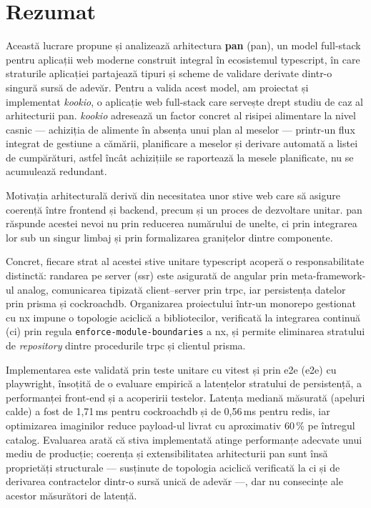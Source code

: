 \section*{Rezumat}

Această lucrare propune și analizează arhitectura \textbf{\gls{pan}} (\acrlong{pan}), un model full-stack pentru aplicații \gls{web} moderne construit integral în ecosistemul \gls{typescript}, în care straturile aplicației partajează tipuri și scheme de validare derivate dintr-o singură sursă de adevăr.
Pentru a valida acest model, am proiectat și implementat \textit{\gls{kookio}}, o aplicație \gls{web} full-stack care servește drept studiu de caz al arhitecturii \gls{pan}.
\textit{\gls{kookio}} adresează un factor concret al risipei alimentare la nivel casnic --- achiziția de alimente în absența unui plan al meselor --- printr-un flux integrat de gestiune a cămării, planificare a meselor și derivare automată a listei de cumpărături, astfel încât achizițiile se raportează la mesele planificate, nu se acumulează redundant.

Motivația arhitecturală derivă din necesitatea unor stive \gls{web} care să asigure coerență între frontend și backend, precum și un proces de dezvoltare unitar.
\gls{pan} răspunde acestei nevoi nu prin reducerea numărului de unelte, ci prin integrarea lor sub un singur limbaj și prin formalizarea granițelor dintre componente.

Concret, fiecare strat al acestei stive unitare \gls{typescript} acoperă o responsabilitate distinctă: randarea pe server (\acrshort{ssr}) este asigurată de \gls{angular} prin meta-framework-ul \gls{analog}, comunicarea tipizată client--server prin \acrshort{trpc}, iar persistența datelor prin \gls{prisma} și \gls{cockroachdb}.
Organizarea proiectului într-un \gls{monorepo} gestionat cu \gls{nx} impune o topologie aciclică a bibliotecilor, verificată la integrarea continuă (\acrshort{ci}) prin regula \texttt{enforce-module-boundaries} a \gls{nx}, și permite eliminarea stratului de \textit{repository} dintre procedurile \acrshort{trpc} și clientul \gls{prisma}.

Implementarea este validată prin teste unitare cu \gls{vitest} și prin \acrlong{e2e} (\acrshort{e2e}) cu \gls{playwright}, însoțită de o evaluare empirică a latențelor stratului de persistență, a performanței front-end și a acoperirii testelor.
Latența mediană măsurată (apeluri calde) a fost de 1,71\,ms pentru \gls{cockroachdb} și de 0,56\,ms pentru \gls{redis}, iar optimizarea imaginilor reduce payload-ul livrat cu aproximativ \(60\,\%\) pe întregul catalog.
Evaluarea arată că stiva implementată atinge performanțe adecvate unui mediu de producție; coerența și extensibilitatea arhitecturii \gls{pan} sunt însă proprietăți structurale --- susținute de topologia aciclică verificată la \acrshort{ci} și de derivarea contractelor dintr-o sursă unică de adevăr ---, dar nu consecințe ale acestor măsurători de latență.
